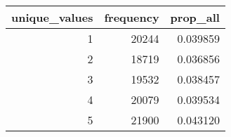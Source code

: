 \begin{tabular}{rrr}
\toprule
 unique\_values &  frequency &  prop\_all \\
\midrule
             1 &      20244 &  0.039859 \\
             2 &      18719 &  0.036856 \\
             3 &      19532 &  0.038457 \\
             4 &      20079 &  0.039534 \\
             5 &      21900 &  0.043120 \\
\bottomrule
\end{tabular}
